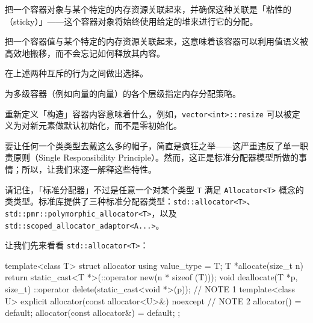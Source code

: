 把一个容器对象与某个特定的内存资源关联起来，并确保这种关联是「粘性的（sticky）」——这个容器对象将始终使用给定的堆来进行它的分配。

把一个容器值与某个特定的内存资源关联起来，这意味着该容器可以利用值语义被高效地搬移，而不会忘记如何释放其内容。

在上述两种互斥的行为之间做出选择。

为多级容器（例如向量的向量）的各个层级指定内存分配策略。

重新定义「构造」容器内容意味着什么，例如，\texttt{vector<\allowbreak{}int>\allowbreak{}::\allowbreak{}resize} 可以被定义为对新元素做默认初始化，而不是零初始化。

要让任何一个类类型去戴这么多的帽子，简直是疯狂之举——这严重违反了单一职责原则（Single Responsibility Principle）。然而，这正是标准分配器模型所做的事情；所以，让我们来逐一解释这些特性。

请记住，「标准分配器」不过是任意一个对某个类型 \texttt{T} 满足 \texttt{Allocator<\allowbreak{}T>\allowbreak{}} 概念的类类型。标准库提供了三种标准分配器类型：\texttt{std::\allowbreak{}allocator<\allowbreak{}T>\allowbreak{}}、\texttt{std::\allowbreak{}pmr::\allowbreak{}polymorphic\_\allowbreak{}allocator<\allowbreak{}T>\allowbreak{}}，以及 \texttt{std::\allowbreak{}scoped\_\allowbreak{}allocator\_\allowbreak{}adaptor<\allowbreak{}A...>}。

让我们先来看看 \texttt{std::\allowbreak{}allocator<\allowbreak{}T>\allowbreak{}}：

\begin{codebox}[cpp]
     template<class T>
     struct allocator {
       using value_type = T;
       T *allocate(size_t n) {
         return static_cast<T *>(::operator new(n * sizeof (T)));
       }
       void deallocate(T *p, size_t) {
         ::operator delete(static_cast<void *>(p));
       }
       // NOTE 1
       template<class U>
       explicit allocator(const allocator<U>&) noexcept {}
       // NOTE 2
       allocator() = default;
       allocator(const allocator&) = default;
     };
\end{codebox}

